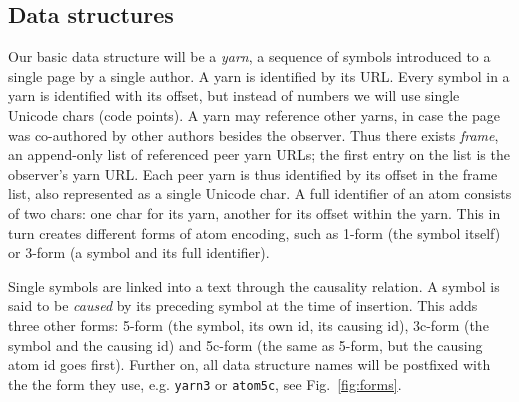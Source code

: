 \documentclass{acm_proc_article-sp}
\begin{document}
\subsection{Data structures}

\newcommand{\aum}{{\fontspec{Devanagari MT}\selectfont ॐ}}
\newcommand{\eoa}{{\fontspec{Geeza Pro}\selectfont ۝}}
\newcommand{\bsp}{{\fontspec{Apple Symbols} ⌫}}
\newcommand{\cnc}{{\fontspec{Apple Symbols} ⌦}}
\newcommand{\zero}{{\fontspec{Apple Symbols} ⌀}}

Our basic data structure will be a \emph{yarn}, a sequence of symbols introduced to a single page by a single author.
A yarn is identified by its URL.
Every symbol in a yarn is identified with its offset, but instead of numbers we will use single Unicode chars (code points).
A yarn may reference other yarns, in case the page was co-authored by other authors besides the observer.
Thus there exists \emph{frame}, an append-only list of referenced peer yarn URLs; the first entry on the list is the observer's yarn URL.
Each peer yarn is thus identified by its offset in the frame list, also represented as a single Unicode char.
A full identifier of an atom consists of two chars: one char for its yarn, another for its offset within the yarn.
This in turn creates different forms of atom encoding, such as 1-form (the symbol itself) or 3-form (a symbol and its full identifier).

Single symbols are linked into a text through the causality relation.
A symbol is said to be \emph{caused} by its preceding symbol at the time of insertion.
This adds three other forms: 5-form (the symbol, its own id, its causing id), 3c-form (the symbol and the causing id) and 5c-form (the same as 5-form, but the causing atom id goes first).
Further on, all data structure names will be postfixed with the the form they use, e.g. {\tt yarn3} or {\tt atom5c}, see Fig.~\ref{fig:forms}.
\end{document}
